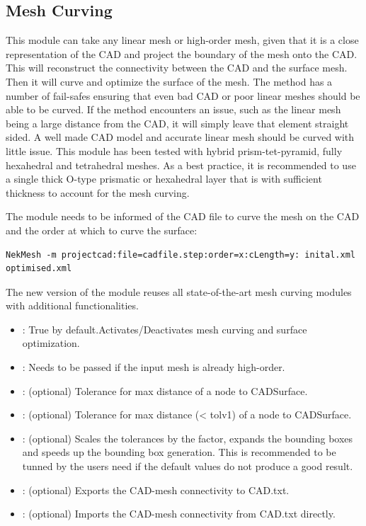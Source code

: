 \subsection{Mesh Curving}
This module can take any linear mesh or high-order mesh, given that it is a close
representation of the CAD and project the boundary of the mesh onto the CAD.
This will reconstruct the connectivity between the CAD and the surface mesh.
Then it will curve and optimize the surface of the mesh. The method has a number
of fail-safes ensuring that even bad CAD or poor linear meshes should be able 
to be curved. If the method encounters an issue, such as the linear mesh being a
large distance from the CAD, it will simply leave that element straight sided. A
well made CAD model and accurate linear mesh should be curved with little issue.
This module has been tested with hybrid prism-tet-pyramid, fully hexahedral and
tetrahedral meshes. As a best practice, it is recommended to use a single thick
O-type prismatic or hexahedral layer that is with sufficient thickness to account
for the mesh curving. 

The module needs to be informed of the CAD file to curve the mesh on the CAD and the
order at which to curve the surface:
\begin{lstlisting}[style=BashInputStyle]
  NekMesh -m projectcad:file=cadfile.step:order=x:cLength=y: inital.xml optimised.xml
\end{lstlisting}

The new version of the module reuses all state-of-the-art mesh curving modules with additional functionalities. 

\begin{itemize}
  \item {}: True by default.Activates/Deactivates mesh curving and surface optimization. 
  \item {}: Needs to be passed if the input mesh is already high-order.
  \item {}: (optional) Tolerance for max distance of a node to CADSurface.
  \item {}: (optional) Tolerance for max distance  (< tolv1) of a node to CADSurface.
  \item {}: (optional) Scales the tolerances by the factor, expands the
  bounding boxes and speeds up the bounding box generation. This is recommended
  to be tunned by the users need if the default values do not produce a good result.
  \item {}: (optional) Exports the CAD-mesh connectivity to CAD.txt.
  \item {}:  (optional) Imports the CAD-mesh connectivity from CAD.txt directly.
\end{itemize}

